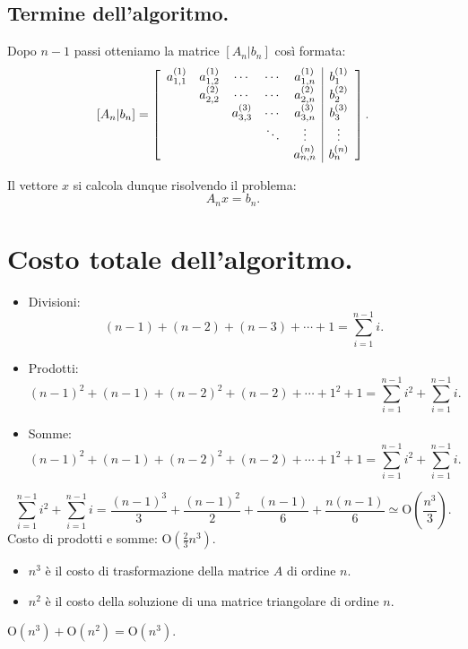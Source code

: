 \subsection{Termine dell'algoritmo.}
Dopo $n-1$ passi otteniamo la matrice $[A_n|b_n]$ così formata:
\[
[A_n|b_n] = \left[
\begin{array}{cccc c|c}
a_{1,1}^{(1)}&a_{1,2}^{(1)}& \cdots &\cdots& a_{1,n}^{(1)}&b_1^{(1)}\\
 & a_{2,2}^{(2)} & \cdots& \cdots & a_{2,n}^{(2)} &  b_2^{(2)}\\
 & &a_{3,3}^{(3)} & \cdots & a_{3,n}^{(3)}&  b_3^{(3)}\\
 & & &\ddots & \vdots & \vdots  \\
 & & & & a_{n,n}^{(n)} & b_n^{(n)}
\end{array} \right].
\]

Il vettore $x$ si calcola dunque risolvendo il problema:
\[
A_nx = b_n.
\]

\section{Costo totale dell'algoritmo.}
\begin{itemize}
\item[]Divisioni: \[(n-1) + (n-2) + (n-3) + \cdots + 1 = \sum_{i=1}^{n-1}i.\]
\item[]Prodotti: \[(n-1)^2 + (n-1) + (n-2)^2 + (n-2) + \cdots + 1^2 + 1 =
\sum_{i=1}^{n-1}i^2 + \sum_{i=1}^{n-1}i.\]
\item[]Somme: \[(n-1)^2 + (n-1) + (n-2)^2 + (n-2) + \cdots + 1^2 + 1 =
\sum_{i=1}^{n-1}i^2 + \sum_{i=1}^{n-1}i.\]
\end{itemize}
\[\sum_{i=1}^{n-1}i^2 + \sum_{i=1}^{n-1}i
= \frac{(n-1)^3}{3} + \frac{(n-1)^2}{2} + \frac{(n-1)}{6} + \frac{n(n-1)}{6}
\simeq \textrm{O}(\frac{n^3}{3}).
\]
Costo di prodotti e somme: $\textrm{O}(\frac{2}{3}n^3)$.
\begin{itemize}
\item[]$n^3$ è il costo di trasformazione della matrice $A$ di ordine $n$.
\item[]$n^2$ è il costo della soluzione di una matrice triangolare di ordine
$n$.
\end{itemize}
$\textrm{O}(n^3) + \textrm{O}(n^2) = \textrm{O}(n^3)$.

